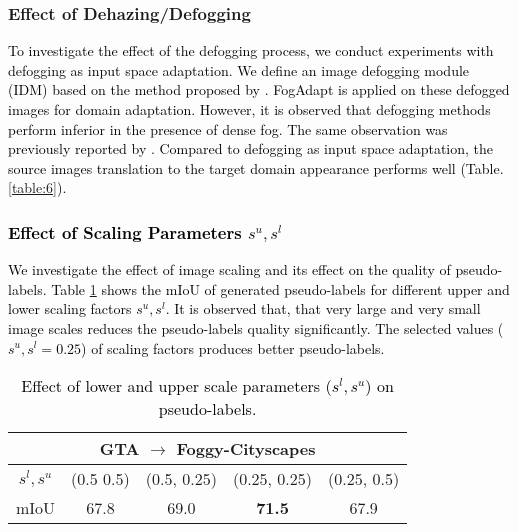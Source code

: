 \documentclass[final,5p,times,twocolumn]{elsarticle}
\begin{document}
\subsubsection{Effect of Dehazing/Defogging}
\textcolor{black}{
To investigate the effect of the defogging process, we conduct experiments with defogging as input space adaptation. We define an image defogging module (IDM) based on the method proposed by \cite{chen2019gated}. FogAdapt is applied on these defogged images for domain adaptation. 
However, it is observed that defogging methods perform inferior in the presence of dense fog. The same observation was previously reported by \cite{dai2019curriculum}. Compared to defogging as input space adaptation, the source images translation to the target domain appearance performs well (Table. \ref{table:6}).}
\begin{table}[H]
\footnotesize
\centering
\caption{A comparative analysis of image transformation methods in dense foggy scenes adaptation process.}
\label{table:6}
\vspace{-0.3cm}
\end{table}

\textcolor{black}{
\subsubsection{Effect of Scaling Parameters $s^u, s^l$}
\label{sec:ablation-sc}
We investigate the effect of image scaling and its effect on the quality of pseudo-labels. Table \ref{table:ablation-sc} shows the mIoU of generated pseudo-labels for different upper and lower scaling factors $s^u, s^l$. It is observed that, that very large and very small image scales reduces the pseudo-labels quality significantly. The selected values ($s^u, s^l = 0.25$) of scaling factors produces better pseudo-labels.
\begin{table}[H]
\footnotesize
\centering
\caption{\textcolor{black}{Effect of lower and upper scale parameters ($s^l, s^u$) on pseudo-labels.}}
{\color{black}\begin{tabular}{c|cccc}
\hline
\multicolumn{5}{c}{GTA $\rightarrow$ Foggy-Cityscapes} \\
\hline
$s^l, s^u$& (0.5 0.5)  & (0.5, 0.25)   & (0.25, 0.25)    & (0.25, 0.5)   \\
\hline
mIoU& 67.8  & 69.0   & \textbf{71.5}    & 67.9   \\
\hline
\end{tabular}}
\label{table:ablation-sc}
\end{table}
}
\end{document}
